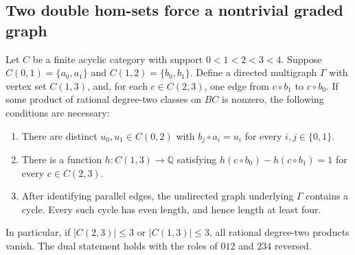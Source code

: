 \subsection{Two double hom-sets force a nontrivial graded graph}
\begin{theorem}[Proved]\label{A7:two-double-graph}
Let $C$ be a finite acyclic category with support $0<1<2<3<4$.
Suppose $C(0,1)=\{a_0,a_1\}$ and $C(1,2)=\{b_0,b_1\}$.
Define a directed multigraph $\Gamma$ with vertex set $C(1,3)$,
and, for each $c\in C(2,3)$, one edge from $c\circ b_1$ to
$c\circ b_0$. If some product of rational degree-two classes on
$BC$ is nonzero, the following conditions are necessary:
\begin{enumerate}
\item There are distinct $u_0,u_1\in C(0,2)$ with
$b_j\circ a_i=u_i$ for every $i,j\in\{0,1\}$.
\item There is a function $h:C(1,3)\to\mathbb Q$ satisfying
$h(c\circ b_0)-h(c\circ b_1)=1$ for every $c\in C(2,3)$.
\item After identifying parallel edges, the undirected graph
underlying $\Gamma$ contains a cycle. Every such cycle has even
length, and hence length at least four.
\end{enumerate}
In particular, if $|C(2,3)|\le3$ or $|C(1,3)|\le3$, all rational
degree-two products vanish. The dual statement holds with the
roles of $012$ and $234$ reversed.
\end{theorem}
